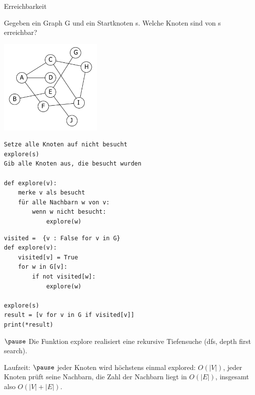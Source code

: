 %
%
%
\begin{frame}[fragile]

\begin{minipage}[c]{5cm}
Erreichbarkeit

Gegeben ein Graph G und ein Startknoten s. Welche Knoten sind von s erreichbar?
\end{minipage}
\begin{minipage}[c]{6cm}
\includegraphics[width=5cm]{bild2.png}
\end{minipage}   \pause

\begin{lstlisting}
Setze alle Knoten auf nicht besucht
explore(s)
Gib alle Knoten aus, die besucht wurden

def explore(v): 
    merke v als besucht
    für alle Nachbarn w von v:
        wenn w nicht besucht:
            explore(w)

\end{lstlisting}

\end{frame}

\begin{frame}[fragile]

\begin{lstlisting}
visited =  {v : False for v in G}       
def explore(v):  
    visited[v] = True
    for w in G[v]:
        if not visited[w]:
            explore(w) 
 
explore(s)
result = [v for v in G if visited[v]]            
print(*result)
\end{lstlisting}   $\pause$
Die Funktion explore realisiert eine rekursive Tiefensuche (dfs, depth first search).

Laufzeit:  $\pause$ jeder Knoten wird höchstens einmal explored:  $O(\left|V\right|)$, jeder Knoten prüft seine Nachbarn, 
die Zahl der Nachbarn liegt in  $O(\left|E\right|)$, insgesamt also   $O(\left|V\right|+\left|E\right|)$.
\end{frame}

